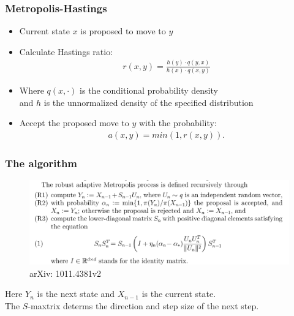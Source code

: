 \documentclass{beamer}
\begin{document}



\begin{frame}
 \frametitle{Metropolis-Hastings}
 \begin{itemize}
  \item Current state $x$ is proposed to move to $y$
  \item Calculate Hastings ratio: \\
        \begin{align}
         r(x,y) = \frac{h(y) \cdot q(y,x)} {h(x) \cdot q(x,y)} \label{eq:r(x,y)}
        \end{align}
  \item Where $q(x,\cdot)$ is the conditional probability density \\
        and $h$ is the unnormalized density of the specified distribution
  \item Accept the proposed move to $y$ with the probability: \\
        \begin{align}
         a(x,y) = min(1,r(x,y)).
        \end{align}
 \end{itemize}
\end{frame}


\begin{frame}
 \frametitle{The algorithm}
 \begin{figure}
  \includegraphics[width=1.0\linewidth]{figures/Metropolis}
  \caption{arXiv: 1011.4381v2}
 \end{figure}
 Here $Y_n$ is the next state and $X_{n-1}$ is the current state. \\
 The $S$-maxtrix determs the direction and step size of the next step. \\
\end{frame}
\end{document}
